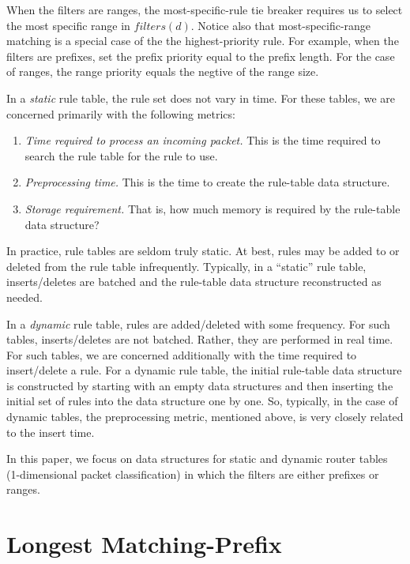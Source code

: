 \begin{enumerate}
When the filters are ranges, the most-specific-rule tie breaker
requires us to select the most specific range in $filters(d)$.
Notice also that most-specific-range matching is a special case of the
the highest-priority rule. For example, when the filters are
prefixes, set the prefix priority equal to the prefix length.
For the case of ranges, the range priority equals the negtive of the
range size.
\end{enumerate}


In a {\em static} rule table, the rule set does not vary in time.
For these tables, we are concerned primarily with the following
metrics:
\begin{enumerate}
\item
{\em Time required to process an incoming packet.} This is the time
required to search the rule table for the rule to use.
\item
{\em Preprocessing time.} This is the time to create the rule-table data
structure. 
\item
{\em Storage requirement.} That is, how much memory is required by the
rule-table data structure?
\end{enumerate}

In practice, rule tables are seldom truly static. At best, rules may be added to
or deleted from the rule table infrequently. Typically, in a ``static''
rule table, inserts/deletes are
batched and the rule-table data structure reconstructed as needed.

In a {\em dynamic} rule table, rules are added/deleted with some frequency.
For such tables, inserts/deletes are not batched. Rather, they are
performed in real time. For such tables, we are concerned
additionally with the time required to insert/delete a rule.
For a dynamic rule table, the initial rule-table data structure is constructed
by starting with an empty data structures and then inserting the
initial set of rules into the data structure one by one. So, typically,
in the case of dynamic tables, the preprocessing metric, mentioned above,
is very closely
related to the insert time.


In this paper, we focus on data structures for static and dynamic router
tables (1-dimensional packet classification) in which the
filters are either prefixes or ranges.

\section{Longest Matching-Prefix}\label{sec:lmp}
